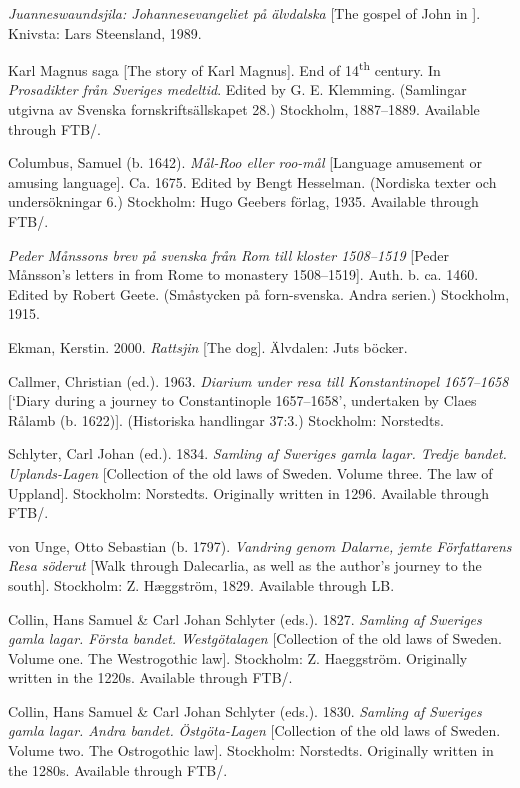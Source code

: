 \documentclass[output=paper]{langscibook}
\begin{document}
\begin{description}[font=\normalfont]
\item[Jua.:] \textit{Juanneswaundsjila: Johannesevangeliet på älvdalska} [The gospel of John in ]. Knivsta: Lars Steensland, 1989.
\item[KM:] Karl Magnus saga [The story of Karl Magnus]. End of 14\textsuperscript{th} century. In \textit{Prosadikter från Sveriges medeltid}. Edited by G. E. Klemming. (Samlingar utgivna av Svenska fornskriftsällskapet 28.) Stockholm, 1887–1889. Available through FTB\slash {}.
\item[Mål-roo:] Columbus, Samuel (b. 1642). \textit{Mål-Roo eller roo-mål} [Language amusement or amusing language]. Ca. 1675. Edited by Bengt Hesselman. (Nordiska texter och undersökningar 6.) Stockholm: Hugo Geebers förlag, 1935. Available through FTB\slash {}.
\item[Måns:] \textit{Peder Månssons brev på svenska från Rom till  kloster 1508–1519} [Peder Månsson’s letters in  from Rome to  monastery 1508–1519]. Auth. b. ca. 1460. Edited by Robert Geete. (Småstycken på forn-svenska. Andra serien.) Stockholm, 1915.
\item[Rattsjin:] Ekman, Kerstin. 2000. \textit{Rattsjin} [The dog]. Älvdalen: Juts böcker. 
\item[Rålamb:] Callmer, Christian (ed.). 1963. \textit{Diarium under resa till Konstantinopel 1657–1658} [`Diary during a journey to Constantinople 1657–1658’, undertaken by Claes Rålamb (b. 1622)]. (Historiska handlingar 37:3.) Stockholm: Norstedts.
\item[UL:] Schlyter, Carl Johan (ed.). 1834. \emph{Samling af Sweriges gamla lagar. Tredje bandet.} \textit{Uplands-Lagen} [Collection of the old laws of Sweden. Volume three. The law of Uppland]. Stockholm: Norstedts. Originally written in 1296. Available through FTB\slash {}.
\item[von Unge:] von Unge, Otto Sebastian (b. 1797). \textit{Vandring genom Dalarne, jemte Författarens Resa söderut} [Walk through Dalecarlia, as well as the author’s journey to the south]. Stockholm: Z. Hæggström, 1829. Available through LB.
\item[\isi{EWL}:] Collin, Hans Samuel \& Carl Johan Schlyter (eds.). 1827. \emph{Samling af Sweriges gamla lagar. Första bandet. Westgötalagen} [Collection of the old laws of Sweden. Volume one. The Westrogothic law]. Stockholm: Z. Haeggström. Originally written in the 1220s. Available through FTB\slash {}.
\item[ÖgL:] Collin, Hans Samuel \& Carl Johan Schlyter (eds.). 1830. \emph{Samling af Sweriges gamla lagar. Andra bandet.} \textit{Östgöta-Lagen} [Collection of the old laws of Sweden. Volume two. The Ostrogothic law]. Stockholm: Norstedts. Originally written in the 1280s. Available through FTB\slash {}.
\end{description}
\end{document}
